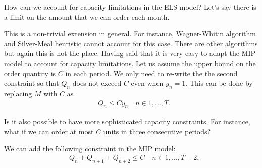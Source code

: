 \begin{exercise}
How can we account for capacity limitations in the ELS model? Let's say there is a limit on the amount that we can order each month.


\begin{solution}
This is a non-trivial extension in general. For instance, Wagner-Whitin algorithm and Silver-Meal heuristic cannot account for this case. There are other algorithms but again this is not the place. Having said that it is very easy to adapt the MIP model to account for capacity limitations. Let us assume the upper bound on the order quantity is $C$ in each period. We only need to re-write the the second constraint so that $Q_n$ does not exceed $C$ even when $y_n=1$. This can be done by replacing $M$ with $C$ as 
\begin{align*}
	& Q_n \leq C y_n \quad n\in 1,\ldots,T.
\end{align*}
\end{solution}
\end{exercise}

\begin{exercise}
Is it also possible to have more sophisticated capacity constraints. For instance, what if we can order at most $C$ units in three consecutive periods?


\begin{solution}
We can add the following constraint in the MIP model:
\begin{align*}
	& Q_n + Q_{n+1} + Q_{n+2} \leq C \quad n\in 1,\ldots,T-2.
\end{align*}
\end{solution}
\end{exercise}

